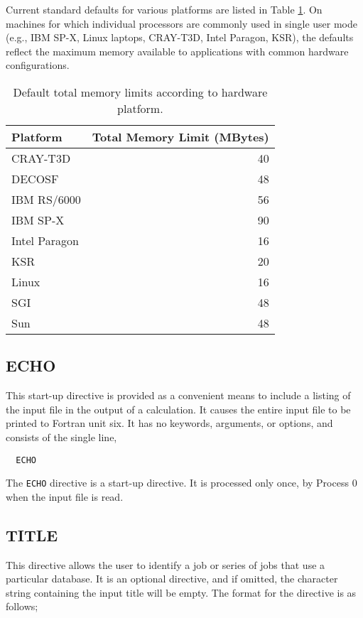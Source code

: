 Current standard defaults for various platforms are listed in Table
\ref{tbl:default-memory-limits}.  On machines for which individual
processors are commonly used in single user mode (e.g., IBM SP-X,
Linux laptops, CRAY-T3D, Intel Paragon, KSR), the defaults reflect
the maximum memory available to applications with common hardware
configurations.

\begin{table}
\caption{Default total memory limits according to hardware platform.}
\label{tbl:default-memory-limits}
\begin{tabular}{lr}
\hline\hline
Platform        & Total Memory Limit (MBytes) \\
\hline
CRAY-T3D        & 40 \\
DECOSF          & 48 \\
IBM RS/6000     & 56 \\
IBM SP-X        & 90 \\
Intel Paragon   & 16 \\
KSR             & 20 \\
Linux           & 16 \\
SGI             & 48 \\
Sun             & 48 \\
\hline\hline
\end{tabular}
\end{table}

\subsection{ECHO}
\label{sec:echo}

This start-up directive is provided as a convenient means to include a
listing of the input file in the output of a calculation.  It causes
the entire input file to be printed to Fortran unit six.  It has no
keywords, arguments, or options, and consists of the single line,

\begin{verbatim}
  ECHO
\end{verbatim}

The \verb+ECHO+ directive is a start-up directive.  It is processed only
once, by Process 0 when the input file is read.

\subsection{TITLE}

This directive allows the user to identify a job or series of jobs that use a
particular database.  It is an optional directive, and if omitted, the 
character string containing the input title will be empty.  The format for 
the directive is as follows;

